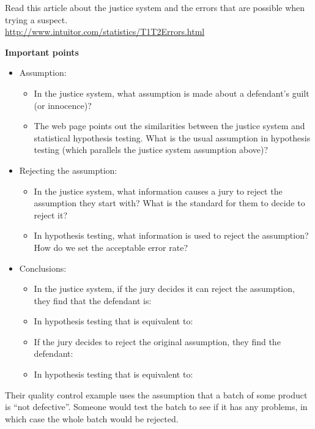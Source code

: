 \def\theTopic{Reading 14}


 Read this article about the justice system and the errors that are
 possible when trying a suspect.\\
\url{http://www.intuitor.com/statistics/T1T2Errors.html}  

\begin{center}
  {\bf Important points}
\end{center}

\begin{itemize}
  \item Assumption:
        \begin{itemize}
        \item In the justice system, what assumption is made about a
          defendant's guilt (or innocence)?\vfill
        \item The web page points out the similarities between the
          justice system and statistical hypothesis testing. What is
          the usual assumption in hypothesis testing (which parallels
          the justice system assumption above)?\vfill
        \end{itemize}
  \item Rejecting the assumption:
    \begin{itemize}
      \item In the justice system, what information causes a jury to
      reject the assumption they start with?  What is the standard for
      them to decide to reject it?\vfill
      \item In hypothesis testing, what information is used to reject
        the assumption?  How do we set the acceptable error rate? \vfill
      \end{itemize}
    \item Conclusions:
      \begin{itemize}
      \item In the justice system, if the jury decides it can reject
        the assumption, they find that the defendant is: \vspace{.8cm}
      \item In hypothesis testing that is equivalent to:\vspace{1cm}
      \item If the jury decides to reject the original assumption, they
        find the defendant: \vspace{.8cm}
      \item In hypothesis testing that is equivalent to:\vspace{1cm}
      \end{itemize}
  \end{itemize}
\newpage
    Their quality control example uses the assumption that a batch of
    some product is ``not defective''. Someone would test the batch to
    see if it has any problems, in which case the whole batch would be
    rejected. 

